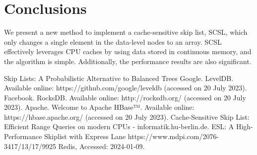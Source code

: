 \documentclass{article}
\begin{document}
\section{Conclusions}
We present a new method to implement a cache-sensitive skip list, SCSL, which only changes a single element in the data-level nodes to an array. SCSL effectively leverages CPU caches by using data stored in continuous memory, and the algorithm is simple. Additionally, the performance results are also significant.
\begin{thebibliography}{9} 
      Skip Lists: A Probabilistic Alternative to Balanced Trees
      Google. LevelDB. Available online: https://github.com/google/leveldb (accessed on 20 July 2023).
      Facebook. RocksDB. Available online: http://rocksdb.org/ (accessed on 20 July 2023).
      Apache. Welcome to Apache HBase™. Available online: https://hbase.apache.org/ (accessed on 20 July 2023).
      Cache-Sensitive Skip List: Efficient Range Queries on modern CPUs - informatik.hu-berlin.de.
      ESL: A High-Performance Skiplist with Express Lane  https://www.mdpi.com/2076-3417/13/17/9925
	Redis, Accessed: 2024-01-09.
\end{thebibliography}
\end{document}

